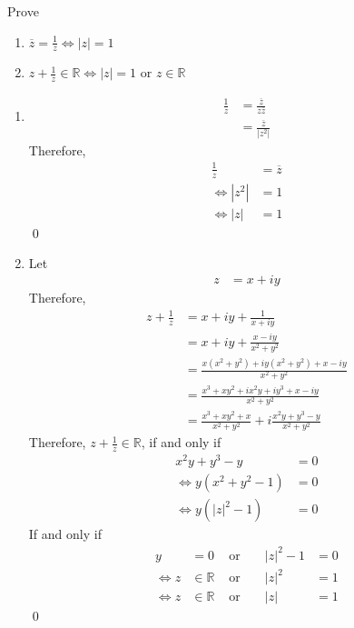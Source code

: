 \documentclass[fleqn, a4paper, 11pt, oneside]{amsart}
\theoremstyle{definition}
\theoremstyle{theorem}
\begin{document}
\setcounter{question}{3}
\begin{question}
	Prove
	\begin{enumerate}
		\item $\overline{z} = \frac{1}{z} \iff |z| = 1$
		\item $z + \frac{1}{z} \in \mathbb{R} \iff |z| = 1 \text{ or } z \in \mathbb{R}$
	\end{enumerate}
\end{question}

\begin{solution}
	\begin{enumerate}[leftmargin=*]
		\item
			\begin{align*}
				\frac{1}{z} &= \frac{\overline{z}}{z \overline{z}}\\
				&= \frac{\overline{z}}{|z^2|}
			\end{align*}
			Therefore,
			\begin{align*}
				\frac{1}{z} &= \overline{z}\\
				\iff |z^2| &= 1\\
				\iff |z| &= 1
			\end{align*}
			\qed
		\item
			Let
			\begin{align*}
				z &= x + iy
			\end{align*}
			Therefore,
			\begin{align*}
				z + \frac{1}{z} &= x + i y + \frac{1}{x + i y}\\
				&= x + i y + \frac{x - i y}{x^2 + y^2}\\
				&= \frac{x (x^2 + y^2) + i y (x^2 + y^2) + x - i y}{x^2 + y^2}\\
				&= \frac{x^3 + x y^2 + i x^2 y + i y^3 + x - i y}{x^2 + y^2}\\
				&= \frac{x^3 + x y^2 + x}{x^2 + y^2} + i \frac{x^2 y + y^3 - y}{x^2 + y^2}
			\end{align*}
			Therefore, $z + \frac{1}{z} \in \mathbb{R}$, if and only if
			\begin{align*}
				x^2 y + y^3 - y &= 0\\
				\iff y (x^2 + y^2 - 1) &= 0\\
				\iff y (|z|^2 - 1) &= 0
			\end{align*}
			If and only if
			\begin{align*}
				y &= 0 &\text{ or }&& |z|^2 - 1 &= 0\\
				\iff z &\in \mathbb{R} &\text{ or }&& |z|^2 &= 1\\
				\iff z &\in \mathbb{R} &\text{ or }&& |z| &= 1
			\end{align*}
			\qed
	\end{enumerate}
\end{solution}
\end{document}
